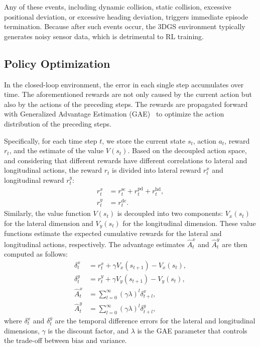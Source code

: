 Any of these events, including dynamic collision, static collision, excessive positional deviation, or excessive heading deviation, triggers immediate episode termination. Because after such events occur, the 3DGS environment typically generates noisy sensor data, which is detrimental to RL training.

\subsection{Policy Optimization}
\label{sec:optimization}
In the closed-loop environment, the error in each single step accumulates over time. The aforementioned rewards are not only caused by the current action but also by the actions of the preceding steps.  
The rewards are propagated forward with Generalized Advantage Estimation (GAE)~\cite{gae} to optimize the action distribution of the preceding steps.

Specifically, for each time step $t$, we store the current state $s_t$, action $a_t$, reward $r_t$, and the estimate of the value $V(s_t)$.  
Based on the decoupled action space, and considering that different rewards have different correlations to lateral and longitudinal actions, the reward $r_t$ is divided into lateral reward $r_t^x$ and longitudinal reward $r_t^y$:
\begin{equation}
\begin{aligned}
r_t^x &= r_t^{\text{sc}} + r_t^{\text{pd}} + r_t^{\text{hd}}, \\
r_t^y &= r_t^{\text{dc}}.
\label{eq:reward-decouple}
\end{aligned}
\end{equation}
Similarly, the value function $V(s_t)$ is decoupled into two components: $V_x(s_t)$ for the lateral dimension and $V_y(s_t)$ for the longitudinal dimension. These value functions estimate the expected cumulative rewards for the lateral and longitudinal actions, respectively. The advantage estimates $\hat{A}_t^x$ and $\hat{A}_t^y$ are then computed as follows:
\begin{equation}
\begin{aligned}
\delta_t^x &= r_t^x + \gamma V_x(s_{t+1}) - V_x(s_t), \\
\delta_t^y &= r_t^y + \gamma V_y(s_{t+1}) - V_y(s_t), \\
\hat{A}_t^x &= \sum_{l=0}^{\infty}(\gamma \lambda)^l \delta_{t+l}^x, \\
\hat{A}_t^y &= \sum_{l=0}^{\infty}(\gamma \lambda)^l \delta_{t+l}^y,
\label{eq:advantage}
\end{aligned}
\end{equation}
where $\delta_t^x$ and $\delta_t^y$ are the temporal difference errors for the lateral and longitudinal dimensions, $\gamma$ is the discount factor, and $\lambda$ is the GAE parameter that controls the trade-off between bias and variance.

